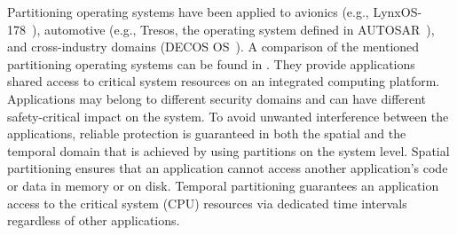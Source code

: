 
%

Partitioning operating systems have been applied to avionics (e.g.,
LynxOS-178~\cite{lynxos-178}), automotive (e.g., Tresos, the
operating system defined in AUTOSAR~\cite{autosar}), and
cross-industry domains (DECOS OS~\cite{DECOS}). A comparison of the
mentioned partitioning operating systems can be found in
\cite{PartitioningOS}. They  provide applications shared access to
critical system resources on an integrated computing platform.
Applications may belong to different security domains and can have
different safety-critical impact on the system. To avoid unwanted 
interference between the applications, reliable protection is
guaranteed in both the spatial and the temporal domain that is
achieved by using partitions on the system level. Spatial
partitioning ensures that an application cannot access another 
application's code or data in memory or on disk. Temporal
partitioning guarantees an application access to the critical system
(CPU) resources via dedicated time intervals regardless of other
applications. 

